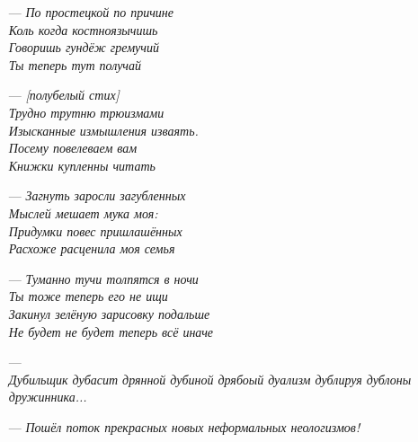 \begin{itemize}
{Коль когда костноязычно говоришь --- голова гудит}
  \item[---] \emph{По простецкой по причине\\
                  Коль когда костноязычишь\\
                  Говоришь гундёж гремучий\\
                  Ты теперь тут получай}
  \item[---] \emph{[полубелый стих]\\
  Трудно трутню трюизмами\\
Изысканные измышления изваять.\\
Посему повелеваем вам\\
Книжки купленны читать}
  \item[---] \emph{Загнуть заросли загубленных\\
Мыслей мешает мука моя:\\
Придумки повес пришлашённых\\
Расхоже расценила моя семья}
  \item[---] \emph{Туманно тучи толпятся в ночи\\
Ты тоже теперь его не ищи\\
Закинул зелёную зарисовку подальше\\
Не будет не будет теперь всё иначе}\\
\emph{}
  \item[---] \emph{}\\
             \emph{Дубильщик дубасит дрянной дубиной дрябоый дуализм дублируя дублоны дружинника...}
  \item[---] \emph{Пошёл поток прекрасных новых неформальных неологизмов!}
\end{itemize}

